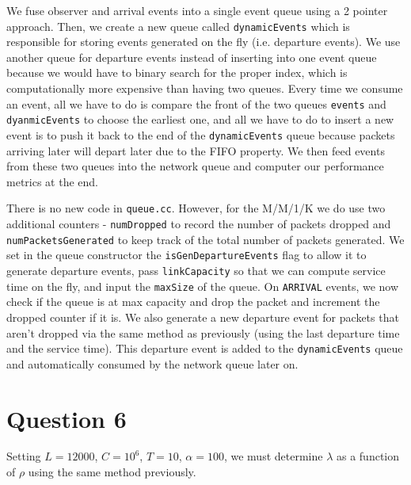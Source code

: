 \documentclass{article}
\begin{document}
We fuse observer and arrival events into a single event queue using a 2 pointer approach. Then, we create a new queue called \texttt{dynamicEvents} which is
responsible for storing events generated on the fly (i.e. departure events). We use another queue for departure events instead of inserting into one event queue because
we would have to binary search for the proper index, which is computationally more expensive than having two queues. Every time we consume an event, all we have to do is compare
the front of the two queues \texttt{events} and \texttt{dyanmicEvents} to choose the earliest one, and all we have to do to insert a new event is to push it back to the
end of the \texttt{dynamicEvents} queue because packets arriving later will depart later due to the FIFO property. We then feed events from these two queues into the network
queue and computer our performance metrics at the end. \newline

There is no new code in \texttt{queue.cc}. However, for the M/M/1/K we do use two additional counters - \texttt{numDropped} to record the number of packets dropped
and \texttt{numPacketsGenerated} to keep track of the total number of packets generated. We set in the queue constructor the \texttt{isGenDepartureEvents} flag to allow it to generate departure events,
pass \texttt{linkCapacity} so that we can compute service time on the fly, and input the \texttt{maxSize} of the queue.
On \texttt{ARRIVAL} events, we now check if the queue is at max capacity and drop the packet and increment the dropped counter if it is. We also generate a new departure
event for packets that aren't dropped via the same method as previously (using the last departure time and the service time). This departure event is added to the \texttt{dynamicEvents} queue
and automatically consumed by the network queue later on.

\section{Question 6}

Setting $L=12000$, $C=10^6$, $T = 10$, $\alpha = 100$, we must determine $\lambda$ as a function of $\rho$ using the same method previously.
\end{document}
